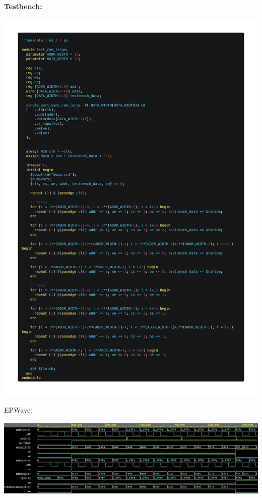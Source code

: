 \documentclass[12pt]{article}
\begin{document}
\textbf{Testbench:}
\begin{center}
    \includegraphics[scale=0.3]{images/ram_large_tb.png}
\end{center}
EPWave:
\begin{center}
    \includegraphics[scale = 0.5]{images/ram_large_tb_wave.png}
\end{center}
\pagebreak
\end{document}
